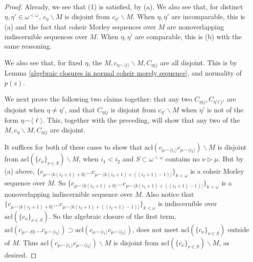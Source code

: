 \documentclass{amsart}
\theoremstyle{definition}
\theoremstyle{remark}
\numberwithin{equation}{section}
\begin{document}
\begin{proof}
Already, we see that (1) is satisfied, by (a). We also see that, for distinct $\eta, \eta' \in \omega^{< \omega}$, $c_{\eta} \backslash M$  is disjoint from $c_{\eta'} \backslash M$. When $\eta, \eta'$ are incomparable, this is (a) and the fact that coheir Morley sequences over $M$ are nonoverlapping indiscernible sequences over $M$. When $\eta, \eta'$ are comparable, this is (b) with the same reasoning.

We also see that, for fixed $\eta$, the $M, c_{ \eta \smallfrown \langle i \rangle}\backslash M, C_{\eta ij}$ are all disjoint. This is by Lemma \ref{algebraic closures in normal coheir morely sequence}, and normality of $p(z)$.

We next prove the following two claims together: that any two $C_{\eta ij}, C_{\eta' i'j'} $ are disjoint when $\eta \neq \eta'$, and that $C_{\eta ij}$ is disjoint from $c_{\eta'} \backslash M$ when $\eta'$ is not of the form $\eta \smallfrown \langle \ell \rangle$. This, together with the preceding, will show that any two of the $M,  c_{\eta} \backslash M , C_{\eta ij}$ are disjoint. 

It suffices for both of these cases to show that 
$\mathrm{acl}(c_{ \mu\smallfrown \langle i_{1} \rangle} c_{ \mu\smallfrown \langle i_{2} \rangle}) \backslash M$ is disjoint from $\mathrm{acl}(\{c_{\nu}\}_{\nu \in S})\backslash M$, when $i_{1} <i_{2}$ and $S \subset \omega^{< \omega}$ contains no $\nu \rhd \mu$. But by (a) above, $\{c_{ \mu \smallfrown \langle k(i_{2}+1) + 0 \rangle} \ldots c_{ \mu \smallfrown \langle k(i_{2}+1) + ((i_{2}+1)-1) \rangle}\}_{k < \omega}$ is a coheir Morley sequence over $M$. So $\{c_{ \mu \smallfrown \langle k(i_{2}+1) + 0 \rangle} \ldots c_{ \mu \smallfrown \langle k(i_{2}+1) + ((i_{2}+1)-1) \rangle}\}_{k < \omega}$ is a nonoverlapping indiscernible sequence over $M$. Also notice that $\{c_{ \mu \smallfrown \langle k(i_{2}+1) + 0 \rangle} \ldots c_{ \mu \smallfrown \langle k(i_{2}+1) + ((i_{2}+1)-1) \rangle}\}_{k < \omega}$ is indiscernible over $\mathrm{acl}(\{c_{\nu}\}_{\nu \in S})$. So the algebraic closure of the first term, $\mathrm{acl}(c_{ \mu \smallfrown \langle  0 \rangle} \ldots c_{ \mu \smallfrown \langle i_{2} \rangle}) \supset \mathrm{acl}(c_{ \mu\smallfrown \langle i_{1} \rangle} c_{ \mu\smallfrown \langle i_{2} \rangle})$, does not meet $\mathrm{acl}(\{c_{\nu}\}_{\nu \in S})$ outside of $M$. Thus $\mathrm{acl}(c_{ \mu\smallfrown \langle i_{1} \rangle} c_{ \mu\smallfrown \langle i_{2} \rangle}) \backslash M$ is disjoint from $\mathrm{acl}(\{c_{\nu}\}_{\nu \in S})\backslash M$, as desired.


\end{proof}
\end{document}
